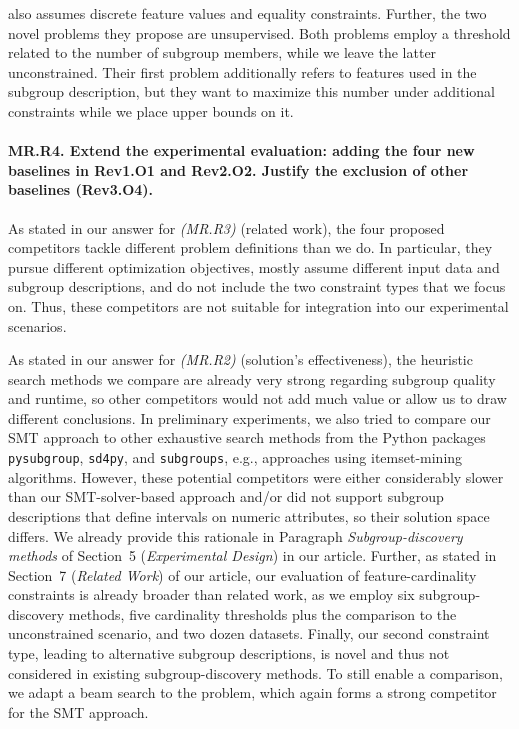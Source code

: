 \documentclass{article}
\begin{document}
\cite{asudeh2019assessing} also assumes discrete feature values and equality constraints.
Further, the two novel problems they propose are unsupervised.
Both problems employ a threshold related to the number of subgroup members, while we leave the latter unconstrained.
Their first problem additionally refers to features used in the subgroup description, but they want to maximize this number under additional constraints while we place upper bounds on it.

\paragraph{MR.R4. Extend the experimental evaluation: adding the four new baselines in Rev1.O1 and Rev2.O2. Justify the exclusion of other baselines (Rev3.O4).}

As stated in our answer for \emph{(MR.R3)} (related work), the four proposed competitors tackle different problem definitions than we do.
In particular, they pursue different optimization objectives, mostly assume different input data and subgroup descriptions, and do not include the two constraint types that we focus on.
Thus, these competitors are not suitable for integration into our experimental scenarios.

As stated in our answer for \emph{(MR.R2)} (solution's effectiveness), the heuristic search methods we compare are already very strong regarding subgroup quality and runtime, so other competitors would not add much value or allow us to draw different conclusions.
In preliminary experiments, we also tried to compare our SMT approach to other exhaustive search methods from the Python packages \texttt{pysubgroup}, \texttt{sd4py}, and \texttt{subgroups}, e.g., approaches using itemset-mining algorithms.
However, these potential competitors were either considerably slower than our SMT-solver-based approach and/or did not support subgroup descriptions that define intervals on numeric attributes, so their solution space differs.
We already provide this rationale in Paragraph \emph{Subgroup-discovery methods} of Section~5 (\emph{Experimental Design}) in our article.
Further, as stated in Section~7 (\emph{Related Work}) of our article, our evaluation of feature-cardinality constraints is already broader than related work, as we employ six subgroup-discovery methods, five cardinality thresholds plus the comparison to the unconstrained scenario, and two dozen datasets.
Finally, our second constraint type, leading to alternative subgroup descriptions, is novel and thus not considered in existing subgroup-discovery methods.
To still enable a comparison, we adapt a beam search to the problem, which again forms a strong competitor for the SMT approach.
\end{document}
